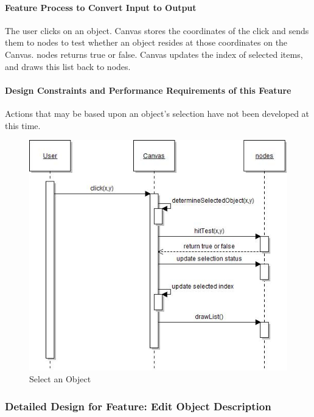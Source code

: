 \documentclass[twoside,letterpaper]{article}
\begin{document}
{\paragraph{Feature Process to Convert Input to Output}
{
The user clicks on an object. Canvas stores the coordinates of the click and sends them to nodes to test whether an object resides at those coordinates on the Canvas.  nodes returns true or false. Canvas updates the index of selected items, and draws this list back to nodes.
}

\paragraph{Design Constraints and Performance Requirements of this Feature}
{
Actions that may be based upon an object{\textquoteright}s selection have not been developed at this time.
}
\bigskip
\bigskip

\begin{figure}[h]
\centering
\includegraphics[width=5.0in]{IntSelectObj.jpg}
\caption{Select an Object}
\end{figure}

\clearpage




% 
%

\subsubsection{Detailed Design for Feature: Edit Object Description}

}
\end{document}
